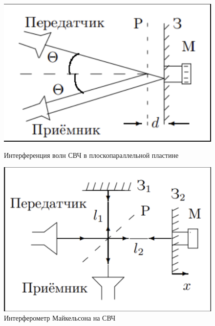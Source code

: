 \documentclass[a4paper,12pt]{article}
\begin{document}
\begin{figure}[h]
\begin{center}
\begin{minipage}[h]{0.45\linewidth}
\includegraphics[width=1\linewidth]{pic 2.PNG}
\caption{Интерференция волн СВЧ в плоскопараллельной пластине} %
\label{ris:experimoriginal} %
\end{minipage}
\hfill 
\begin{minipage}[h]{0.45\linewidth}
\includegraphics[width=1\linewidth]{pic 3.PNG}
\caption{Интерферометр Майкельсона на СВЧ}
\label{ris:experimcoded}
\end{minipage}
\end{center}
\end{figure}
\end{document}

